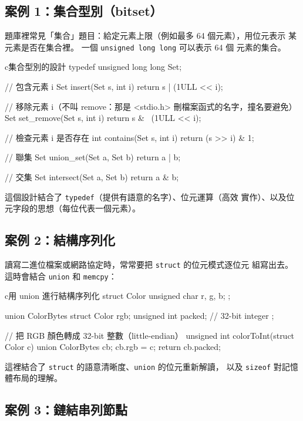 \subsection{案例 1：集合型別（bitset）}

題庫裡常見「集合」題目：給定元素上限（例如最多 64 個元素），用位元表示
某元素是否在集合裡。 一個 \texttt{unsigned long long} 可以表示 64 個
元素的集合。

\begin{code}{c}{集合型別的設計}
typedef unsigned long long Set;

// 包含元素 i
Set insert(Set s, int i) {
    return s | (1ULL << i);
}

// 移除元素 i（不叫 remove：那是 <stdio.h> 刪檔案函式的名字，撞名要避免）
Set set_remove(Set s, int i) {
    return s & ~(1ULL << i);
}

// 檢查元素 i 是否存在
int contains(Set s, int i) {
    return (s >> i) & 1;
}

// 聯集
Set union_set(Set a, Set b) {
    return a | b;
}

// 交集
Set intersect(Set a, Set b) {
    return a & b;
}
\end{code}

這個設計結合了 \texttt{typedef}（提供有語意的名字）、位元運算（高效
實作）、以及位元字段的思想（每位代表一個元素）。

\subsection{案例 2：結構序列化}

讀寫二進位檔案或網路協定時，常常要把 \texttt{struct} 的位元模式逐位元
組寫出去。 這時會結合 \texttt{union} 和 \texttt{memcpy}：

\begin{code}{c}{用 union 進行結構序列化}
struct Color {
    unsigned char r, g, b;
};

union ColorBytes {
    struct Color rgb;
    unsigned int packed;  // 32-bit integer
};

// 把 RGB 顏色轉成 32-bit 整數（little-endian）
unsigned int colorToInt(struct Color c) {
    union ColorBytes cb;
    cb.rgb = c;
    return cb.packed;
}
\end{code}

這裡結合了 \texttt{struct} 的語意清晰度、\texttt{union} 的位元重新解讀，
以及 \texttt{sizeof} 對記憶體布局的理解。

\subsection{案例 3：鏈結串列節點}

